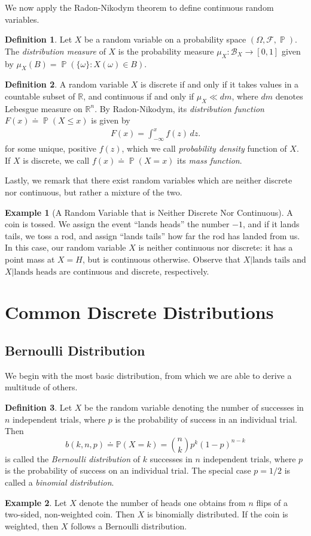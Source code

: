 \documentclass[12pt]{amsbook}
\newcommand{\rr}{\mathbb{R}}
\newcommand{\filter}{\mathcal{F}}
\newcommand{\borel}{\mathcal{B}}
\DeclareMathOperator{\prob}{\mathbb{P}}
\theoremstyle{plain}
\theoremstyle{definition}
\newtheorem*{definition}{Definition}
\newtheorem*{example}{Example}
\theoremstyle{remark}
\numberwithin{equation}{section}  %
\begin{document}
We now apply the Radon-Nikodym theorem to define continuous random variables.
\begin{definition}
	Let $X$ be a random variable on a probability space $(\Omega, \filter, 
	\prob)$. 
	The \emph{distribution measure} of $X$ is the probability measure $\mu_X:
	\borel_X \to [0,1]$ given by $\mu_X(B) = \prob(\{\omega\}: X(\omega) \in 
	B)$.
\end{definition}
\begin{definition}
	A random variable $X$ is discrete if and only if it takes values in a 
	countable
	subset of $\rr$, and continuous if and only if $\mu_X \ll dm$, where $dm$
	denotes Lebesgue measure on $\rr^n$. By Radon-Nikodym, its 
	\emph{distribution
	function} $F(x) \doteq \prob(X \le x)$ is given by
	\begin{align*}
		F(x) = \int_{-\infty}^x f(z) \,dz.
	\end{align*}
	for some unique, positive $f(z)$, which we call \emph{probability density}
	function of $X$.
	If $X$ is discrete, we call
	$f(x) \doteq \prob(X = x)$ its \emph{mass function}.
\end{definition}
Lastly, we remark that there exist random variables which are neither
discrete nor continuous, but rather a mixture of the two.
\begin{example}[A Random Variable that is Neither Discrete Nor Continuous]
	A coin is tossed. We assign the event ``lands heads'' the number $-1$, and 
	if it lands tails, we toss a rod, and assign ``lands tails'' how far the 
	rod has
	landed from us. In this case, our random variable $X$ is neither continuous 
	nor
	discrete: it has a point mass at $X = H$, but is continuous otherwise.
	Observe that $X | \text{lands tails}$ and $X | \text{lands heads}$ are
	continuous and discrete, respectively.
\end{example}
\section{Common Discrete Distributions}
\subsection{Bernoulli Distribution}
We begin with the most basic distribution, from which
we are able to derive a multitude of others.
\begin{definition}
	Let $X$ be the random variable denoting the number of successes
	in $n$ independent trials, where $p$ is the probability of success in
	an individual trial. Then
	\begin{equation*}
		b(k, n, p) \doteq \mathbb{P}(X = k) = \binom{n}{k} p^k {(1 - p)}^{n-k}
	\end{equation*}
	is called the \emph{Bernoulli distribution} of $k$ successes
	in $n$ independent trials, where $p$ is the probability of success on an
	individual trial. The special case
	$p = 1/2$ is called a \emph{binomial distribution}.
\end{definition}
\begin{example}
	Let $X$ denote the number of heads one obtains from $n$ flips of a
	two-sided, non-weighted coin. Then $X$ is binomially distributed.
	If the coin is weighted, then $X$ follows a Bernoulli distribution.
\end{example}
\end{document}
